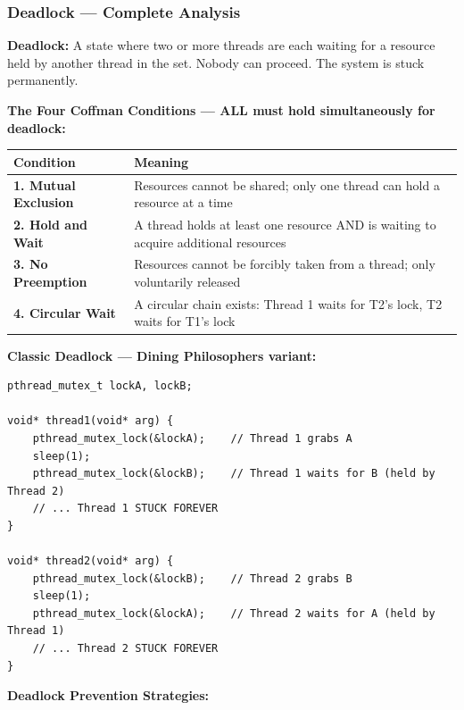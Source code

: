 \documentclass[11pt,a4paper]{article}
\newcommand{\term}[1]{\textbf{\color{darkblue}#1}}
\begin{document}
\subsubsection{Deadlock --- Complete Analysis}

\begin{mydef}
\textbf{Deadlock:} A state where two or more threads are each waiting for a resource held by another thread in the set. Nobody can proceed. The system is stuck permanently.
\end{mydef}

\textbf{The Four Coffman Conditions --- ALL must hold simultaneously for deadlock:}

\begin{center}
\begin{tabular}{L{4cm} L{9cm}}
\toprule
\textbf{Condition} & \textbf{Meaning} \\
\midrule
\term{1. Mutual Exclusion} & Resources cannot be shared; only one thread can hold a resource at a time \\[4pt]
\term{2. Hold and Wait} & A thread holds at least one resource AND is waiting to acquire additional resources \\[4pt]
\term{3. No Preemption} & Resources cannot be forcibly taken from a thread; only voluntarily released \\[4pt]
\term{4. Circular Wait} & A circular chain exists: Thread 1 waits for T2's lock, T2 waits for T1's lock \\
\bottomrule
\end{tabular}
\end{center}

\textbf{Classic Deadlock --- Dining Philosophers variant:}
\begin{lstlisting}
pthread_mutex_t lockA, lockB;

void* thread1(void* arg) {
    pthread_mutex_lock(&lockA);    // Thread 1 grabs A
    sleep(1);
    pthread_mutex_lock(&lockB);    // Thread 1 waits for B (held by Thread 2)
    // ... Thread 1 STUCK FOREVER
}

void* thread2(void* arg) {
    pthread_mutex_lock(&lockB);    // Thread 2 grabs B
    sleep(1);
    pthread_mutex_lock(&lockA);    // Thread 2 waits for A (held by Thread 1)
    // ... Thread 2 STUCK FOREVER
}
\end{lstlisting}

\textbf{Deadlock Prevention Strategies:}
\end{document}
